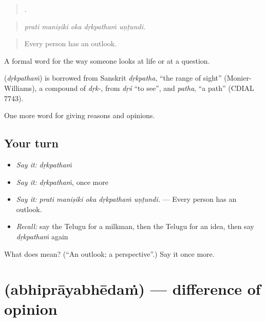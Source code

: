 \begin{quote}
    .
\end{quote}

\begin{quote}
\emph{prati maniṣiki oka dṛkpathaṁ uṇṭundi.}
\end{quote}

\begin{quote}
Every person has an outlook.
\end{quote}

A formal word for the way someone looks at life or at a question.

\begin{cousinweb}
\textbf{} (\emph{dṛkpathaṁ}) is borrowed from Sanskrit \emph{dṛkpatha}, \textquotedblleft{}the range of sight\textquotedblright{} (Monier-Williams), a compound of \emph{dṛk-}, from \emph{dṛś} \textquotedblleft{}to see\textquotedblright{}, and \emph{patha}, \textquotedblleft{}a path\textquotedblright{} (CDIAL 7743).
\end{cousinweb}

\begin{grammarlens}[title={What you've built}]
One more word for giving reasons and opinions.
\end{grammarlens}

\subsection*{Your turn}
\begin{itemize}
\raggedright
  \item \emph{Say it:} \emph{dṛkpathaṁ}
  \item \emph{Say it:} \emph{dṛkpathaṁ}, once more
  \item \emph{Say it:} \emph{prati maniṣiki oka dṛkpathaṁ uṇṭundi.} — Every person has an outlook.
  \item \emph{Recall:} say the Telugu for a milkman, then the Telugu for an idea, then say \emph{dṛkpathaṁ} again
\end{itemize}

\begin{tcolorbox}[breakable,colback=teal!4,colframe=teal!35!black,title={Before you move on}]
What does  mean? (\textquotedblleft{}An outlook; a perspective\textquotedblright{}.) Say it once more.
\end{tcolorbox}
\section[\texorpdfstring{\te{అభిప్రాయభేదం} (abhiprāyabhēdaṁ)}{అభిప్రాయభేదం (abhiprāyabhēdaṁ)}]{ (abhiprāyabhēdaṁ) — difference of opinion}

